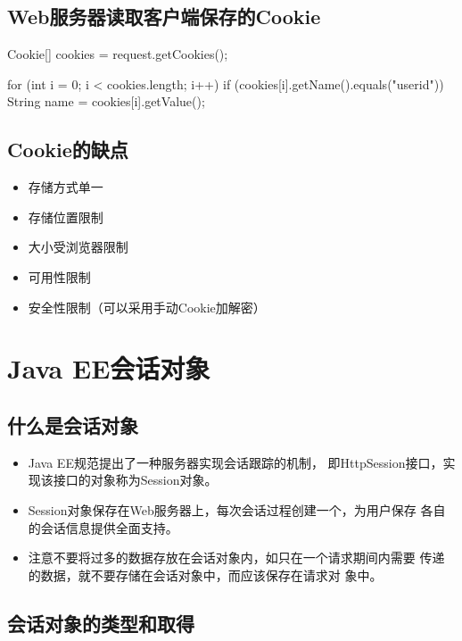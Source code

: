 \subsection{Web服务器读取客户端保存的Cookie}


\begin{javaCode}
  Cookie[] cookies = request.getCookies();
  
  for (int i = 0; i < cookies.length; i++) {
    if (cookies[i].getName().equals("userid")) {
      String name = cookies[i].getValue();
    }
  }
\end{javaCode}

\subsection{Cookie的缺点}

  \begin{itemize}
  \item 存储方式单一
  \item 存储位置限制
  \item 大小受浏览器限制
  \item 可用性限制
  \item 安全性限制（可以采用手动Cookie加解密）
  \end{itemize}

\section{Java EE会话对象}

\subsection{什么是会话对象}

\begin{itemize}
\item Java EE规范提出了一种服务器实现{\Red\hei 会话跟踪}的机制，
  即HttpSession接口，实现该接口的对象称为Session对象。
\item Session对象保存在Web服务器上，每次会话过程创建一个，为用户保存
  各自的会话信息提供全面支持。
\item 注意不要将过多的数据存放在会话对象内，如只在一个请求期间内需要
  传递的数据，就不要存储在会话对象中，而应该保存在{\Red\hei 请求对
    象}中。
\end{itemize}

\subsection{会话对象的类型和取得} 

